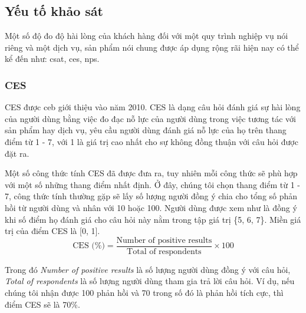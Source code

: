 \subsection{Yếu tố khảo sát}
Một số độ đo độ hài lòng của khách hàng đối với một quy trình nghiệp vụ nói riêng và một dịch vụ, sản phẩm nói chung được áp dụng rộng rãi hiện nay có thể kể đến như: \acrfull*{csat}, \acrfull*{ces}, \acrfull*{nps}.

\subsubsection{CES}

CES được \acrfull*{ceb} giới thiệu vào năm 2010. CES là dạng câu hỏi đánh giá sự hài lòng của người dùng bằng việc đo đạc nỗ lực của người dùng trong việc tương tác với sản phẩm hay dịch vụ, yêu cầu người dùng đánh giá nỗ lực của họ trên thang điểm từ 1 - 7, với 1 là giá trị cao nhất cho sự không đồng thuận với câu hỏi được đặt ra. 
\par
Một số công thức tính CES đã được đưa ra, tuy nhiên mỗi công thức sẽ phù hợp với một số những thang điểm nhất định. Ở đây, chúng tôi chọn thang điểm từ 1 - 7, công thức tính thường gặp sẽ lấy số lượng người đồng ý chia cho tổng số phản hồi từ người dùng và nhân với 10 hoặc 100. Người dùng được xem như là đồng ý khi số điểm họ đánh giá cho câu hỏi này nằm trong tập giá trị \{5, 6, 7\}. Miền giá trị của điểm CES là [0, 1].
\[ \text{CES (\%)} = \frac{\text{Number of positive results}}{\text{Total of respondents}} \times 100 \]
\par
Trong đó \emph{Number of positive results} là số lượng người dùng đồng ý với câu hỏi, \emph{Total of respondents} là số lượng người dùng tham gia trả lời câu hỏi. Ví dụ, nếu chúng tôi nhận được 100 phản hồi và 70 trong số đó là phản hồi tích cực, thì điểm CES sẽ là 70\%.

